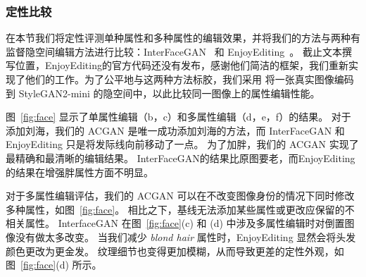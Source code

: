\subsubsection{定性比较}
在本节我们将定性评测单种属性和多种属性的编辑效果，并将我们的方法与两种有监督隐空间编辑方法进行比较：InterFaceGAN~\cite{interfacegan} 和 EnjoyEditing~\cite{iclr2021}。 截止文本撰写位置，EnjoyEditing的官方代码还没有发布，感谢他们简洁的框架，我们重新实现了他们的工作。为了公平地与这两种方法标胶，我们采用 \cite{image2stylegan} 将一张真实图像编码到 StyleGAN2-mini 的隐空间中，以此比较同一图像上的属性编辑性能。

图~\ref{fig:face} 显示了单属性编辑（b，c）和多属性编辑（d，e，f）的结果。 对于添加刘海，我们的 ACGAN 是唯一成功添加刘海的方法，而 InterFaceGAN 和 EnjoyEditing 只是将发际线向前移动了一点。 为了加胖，我们的 ACGAN 实现了最精确和最清晰的编辑结果。 InterFaceGAN的结果比原图要老，而EnjoyEditing的结果在增强胖属性方面不明显。

对于多属性编辑评估，我们的 ACGAN 可以在不改变图像身份的情况下同时修改多种属性，如图~\ref{fig:face}。 相比之下，基线无法添加某些属性或更改应保留的不相关属性。 InterfaceGAN 在图~\ref{fig:face}(c) 和 (d) 中涉及多属性编辑时对倒置图像没有做太多改变。 当我们减少 \textit{blond hair} 属性时，EnjoyEditing 显然会将头发颜色更改为更金发。 纹理细节也变得更加模糊，从而导致更差的定性外观，如图~\ref{fig:face}(d) 所示。

